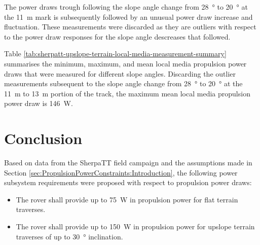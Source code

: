 The power draws trough following the slope angle change from \SI{28}{\degree} to \SI{20}{\degree} at the \SI{11}{\meter} mark is subsequently followed by an unusual power draw increase and fluctuation. These measurements were discarded as they are outliers with respect to the power draw responses for the slope angle descreases that followed.

Table \ref{tab:sherpatt-upslope-terrain-local-media-measurement-summary} summarises the minimum, maximum, and mean local media propulsion power draws that were measured for different slope angles. Discarding the outlier measurements subsequent to the slope angle change from \SI{28}{\degree} to \SI{20}{\degree} at the \SI{11}{\meter} to \SI{13}{\meter} portion of the track, the maximum mean local media propulsion power draw is \SI{146}{\watt}.

\clearpage


\section{Conclusion}
\label{sec:PropulsionPowerConstraints:Conclusion}
Based on data from the SherpaTT field campaign and the assumptions made in Section \ref{sec:PropulsionPowerConstraints:Introduction}, the following power subsystem requirements were proposed with respect to propulsion power draws:

\begin{itemize}
    \item The rover shall provide up to \SI{75}{\watt} in propulsion power for flat terrain traverses.
    \item The rover shall provide up to \SI{150}{\watt} in propulsion power for upslope terrain traverses of up to \SI{30}{\degree} inclination.
\end{itemize}

